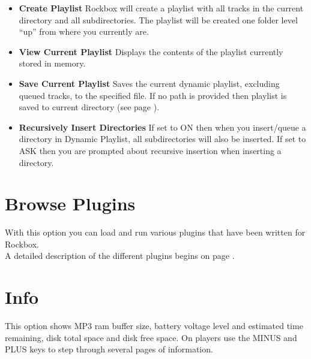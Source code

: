 \begin{itemize}
\item \textbf{Create Playlist}
Rockbox will create a playlist with all tracks in the current directory and all subdirectories. The playlist will be created one folder level ``up'' from
where you currently are. 

\item \textbf{View Current Playlist}
Displays the contents of the playlist currently stored in memory.

\item \textbf{Save Current Playlist}
Saves the current dynamic playlist, excluding queued tracks, to the specified file. If no path is provided then playlist is saved to current directory (see page \pageref{ref:Playlistsubmenu}).

\item \textbf{Recursively Insert Directories}
If set to ON then when you insert/queue a directory in Dynamic Playlist, all subdirectories will also be inserted. If set to ASK then you are prompted about recursive insertion when inserting a directory.
\end{itemize}

\section{Browse Plugins}
With this option you can load and run various plugins that have been written for Rockbox.\\

A detailed description of the different plugins begins on page \pageref{ref:Part5}.

\section{\label{ref:Info}Info}
This option shows MP3 ram buffer size, battery voltage level and estimated time remaining, disk total space and disk free space.
On players use the MINUS and PLUS keys to step through several pages of information.

